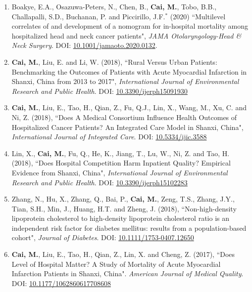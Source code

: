 \documentclass[11pt, a4paper]{article}
\newcommand{\years}[1]{\marginnote{\scriptsize #1}}
\begin{document}
\begin{enumerate}[leftmargin=0ex,itemsep=1ex]
		\item Boakye, E.A., Osazuwa-Peters, N., Chen, B., \textbf{Cai, M.}, Tobo, B.B., Challapalli, S.D., Buchanan, P. and Piccirillo, J.F.$^\ast$ (2020) ``Multilevel correlates of and development of a nomogram for in-hospital mortality among hospitalized head and neck cancer patients", \emph{JAMA Otolaryngology-Head \& Neck Surgery}. DOI: \href{https://doi.org/10.1001/jamaoto.2020.0132}{10.1001/jamaoto.2020.0132}.

		
		
		\item \textbf{Cai, M.}, Liu, E. and Li, W. (2018), ``Rural Versus Urban Patients: Benchmarking the Outcomes of Patients with Acute Myocardial Infarction in Shanxi, China from 2013 to 2017", \emph{International Journal of Environmental Research and Public Health}. DOI: \href{https://doi.org/10.3390/ijerph15091930}{10.3390/ijerph15091930}
		
		\item \textbf{Cai, M.}, Liu, E., Tao, H., Qian, Z., Fu, Q.J., Lin, X., Wang, M., Xu, C. and Ni, Z. (2018), ``Does A Medical Consortium Influence Health Outcomes of Hospitalized Cancer Patients? An Integrated Care Model in Shanxi, China", \emph{International Journal of Integrated Care}. DOI: \href{https://doi.org/10.5334/ijic.3588}{10.5334/ijic.3588}
		
		\item \years{2018}Lin, X., \textbf{Cai, M.}, Fu, Q., He, K., Jiang, T., Lu, W., Ni, Z. and Tao, H. (2018), ``Does Hospital Competition Harm Inpatient Quality? Empirical Evidence from Shanxi, China", \emph{International Journal of Environmental Research and Public Health}. DOI: \href{https://doi.org/10.3390/ijerph15102283}{10.3390/ijerph15102283}
		
		\item Zhang, N., Hu, X., Zhang, Q., Bai, P., \textbf{Cai, M.}, Zeng, T.S., Zhang, J.Y., Tian, S.H., Min, J., Huang, H.T. and Zheng, J. (2018), ``Non-high-density lipoprotein cholesterol to high-density lipoprotein cholesterol ratio is an independent risk factor for diabetes mellitus: results from a population-based cohort", \emph{Journal of Diabetes}. DOI: \href{https://doi.org/10.1111/1753-0407.12650}{10.1111/1753-0407.12650}
		
		
		\item \years{2017}\textbf{Cai, M.}, Liu, E., Tao, H., Qian, Z., Lin, X. and Cheng, Z. (2017), ``Does Level of Hospital Matter? A Study of Mortality of Acute Myocardial Infarction Patients in Shanxi, China". \emph{American Journal of Medical Quality}. DOI: \href{https://doi.org/10.1177/1062860617708608}{10.1177/1062860617708608}
		

\end{enumerate}
\end{document}
